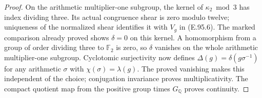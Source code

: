 \begin{proof}
On the arithmetic multiplier-one subgroup, the kernel of
\(\kappa_2\bmod3\) has index dividing three.
Its actual congruence shear is zero modulo twelve; uniqueness of
the normalized shear identifies it with \(V_g\) in (E.95.6).
The marked comparison already proved shows \(\delta=0\) on this
kernel.  A homomorphism from a group of order dividing three to
\(\mathbb F_2\) is zero, so \(\delta\) vanishes on the whole
arithmetic multiplier-one subgroup.
Cyclotomic surjectivity now defines
\(\Delta(g)=\delta(g\sigma^{-1})\) for any arithmetic
\(\sigma\) with \(\chi(\sigma)=\lambda(g)\).
The proved vanishing makes this independent of the choice;
conjugation invariance proves multiplicativity.
The compact quotient map from the positive group times
\(G_{\mathbb Q}\) proves continuity.
\end{proof}

